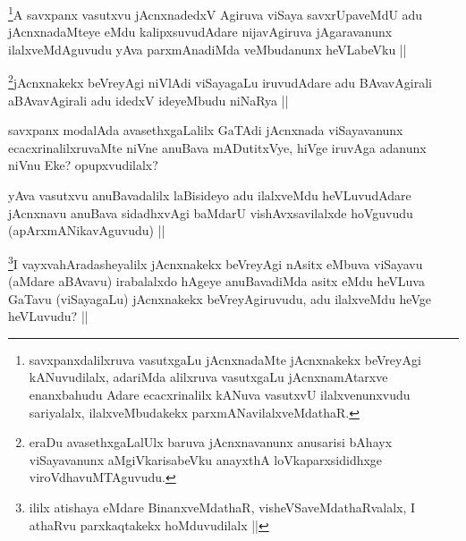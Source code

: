 \begin{artha}
\footnote{savxpanxdalilxruva vasutxgaLu jAcnxnadaMte jAcnxnakekx beVreyAgi kANuvudilalx, adariMda alilxruva vasutxgaLu jAcnxnamAtarxve enanxbahudu Adare ecacxrinalilx kANuva vasutxvU ilalxvenunxvudu sariyalalx, ilalxveMbudakekx parxmANavilalxveMdathaR.}A savxpanx vasutxvu jAcnxnadedxV Agiruva viSaya savxrUpaveMdU adu jAcnxnadaMteye eMdu kalipxsuvudAdare nijavAgiruva jAgaravanunx ilalxveMdAguvudu yAva parxmAnadiMda veMbudanunx heVLabeVku ||
\end{artha}

\begin{artha}
\footnote{eraDu avasethxgaLalUlx baruva jAcnxnavanunx anusarisi bAhayx viSayavanunx aMgiVkarisabeVku anayxthA loVkaparxsididhxge viroVdhavuMTAguvudu.}jAcnxnakekx beVreyAgi niVlAdi viSayagaLu iruvudAdare adu BAvavAgirali aBAvavAgirali adu idedxV ideyeMbudu niNaRya ||
\end{artha}

\begin{artha}
savxpanx modalAda avasethxgaLalilx GaTAdi jAcnxnada viSayavanunx ecacxrinalilxruvaMte niVne anuBava mADutitxVye, hiVge iruvAga adanunx niVnu Eke? opupxvudilalx?
\end{artha}

\begin{artha}
yAva vasutxvu anuBavadalilx laBisideyo adu ilalxveMdu heVLuvudAdare jAcnxnavu anuBava sidadhxvAgi baMdarU vishAvxsavilalxde hoVguvudu (apArxmANikavAguvudu) ||
\end{artha}

\begin{artha}
\footnote{ililx atishaya eMdare BinanxveMdathaR, visheVSaveMdathaRvalalx, I athaRvu parxkaqtakekx hoMduvudilalx ||}I vayxvahAradasheyalilx jAcnxnakekx beVreyAgi nAsitx eMbuva viSayavu (aMdare aBAvavu) irabalalxdo hAgeye anuBavadiMda asitx eMdu heVLuva GaTavu (viSayagaLu) jAcnxnakekx beVreyAgiruvudu, adu ilalxveMdu heVge heVLuvudu? ||
\end{artha}

